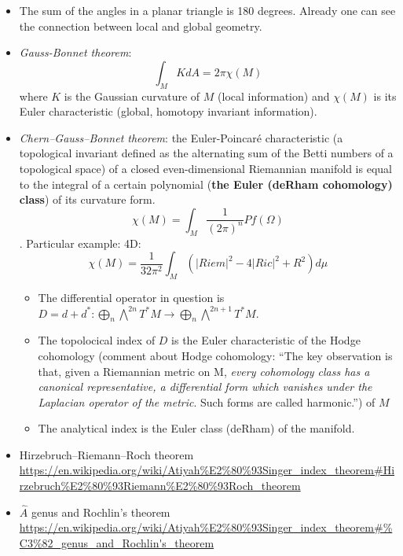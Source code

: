 \documentclass{article}
\begin{document}
\begin{itemize}
    \item The sum of the angles in a planar triangle is 180 degrees. Already one can see the connection between local and global geometry.
    
    \item \emph{Gauss-Bonnet theorem}: \[\int_M K dA = 2\pi \chi(M)\] where $K$ is the Gaussian curvature of $M$ (local information) and $\chi(M)$ is its Euler characteristic (global, homotopy invariant information).

    \item \emph{Chern–Gauss–Bonnet theorem}: the Euler-Poincaré characteristic (a topological invariant defined as the alternating sum of the Betti numbers of a topological space) of a closed even-dimensional Riemannian manifold is equal to the integral of a certain polynomial (\textbf{the Euler (deRham cohomology) class}) of its curvature form. \[\chi(M) = \int_M \frac{1}{(2\pi)^n} Pf(\Omega)\]. Particular example: 4D: \[ \chi(M) = \frac{1}{32 \pi^2} \int_M (|Riem|^2 - 4|Ric|^2 + R^2) d\mu \]
    
        \begin{itemize}
        \item The differential operator in question is $D = d + d^* : \bigoplus_n \bigwedge^{2n}T^*M \to \bigoplus_n \bigwedge^{2n+1}T^*M$.
        
        \item The topolocical index of $D$ is the Euler characteristic of the Hodge cohomology (comment about Hodge cohomology: ``The key observation is that, given a Riemannian metric on M, \emph{every cohomology class has a canonical representative, a differential form which vanishes under the Laplacian operator of the metric}. Such forms are called harmonic.'') of $M$
        
        \item The analytical index is the Euler class (deRham) of the manifold.
        \end{itemize}
    
    \item Hirzebruch–Riemann–Roch theorem \url{https://en.wikipedia.org/wiki/Atiyah\%E2\%80\%93Singer_index_theorem#Hirzebruch\%E2\%80\%93Riemann\%E2\%80\%93Roch_theorem}
    
    \item $\hat A$ genus and Rochlin's theorem \url{https://en.wikipedia.org/wiki/Atiyah\%E2\%80\%93Singer_index_theorem#\%C3\%82_genus_and_Rochlin's_theorem}

\end{itemize}
\end{document}
